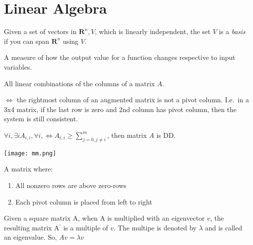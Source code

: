 \section{Linear Algebra}

\begin{definition}[Basis]
    Given a set of vectors in $\mathbf{R}^{n}, V$, which is linearly
    independent, the set $V$ is a \textit{basis} if you can span 
    $\mathbf{R}^{n}$ using $V$.
\end{definition}

\begin{definition}\label{conditionnumber}
    A measure of how the output value for a function changes respective to 
    input variables.
\end{definition}

\begin{definition}
    All linear combinations of the columns of a matrix $A$.
\end{definition}

\begin{definition}[Consistent]
    $\iff$ the rightmost column of an augmented matrix is not a pivot column.
    I.e.\ in a 3x4 matrix, if the last row is zero and 2nd column has pivot
    column, then the system is still consistent.
\end{definition}

\begin{definition}
    $\forall{i}, \exists{i} A_{i, i}, \forall i, \iff A_{i,i} 
    \geq \sum\limits_{j = 0, j\neq i}^{m}$,
    then matrix $A$ is DD.
\end{definition}

\begin{definition}
    \texttt{[image: mm.png]}
\end{definition}

\begin{definition}
    A matrix where:
    \begin{enumerate}
        \item All nonzero rows are above zero-rows
        \item Each pivot column is placed from left to right
    \end{enumerate}
\end{definition}

\begin{definition}[Eigenvector]\label{eigen}
    Given a square matrix A, when A is multiplied with an eigenvector $v$,
    the resulting matrix A${^\prime}$ is a multiple of $v$.
    The multipe is denoted by $\lambda$ and is called an eigenvalue.
    So, $Av = \lambda v$

\end{definition}

